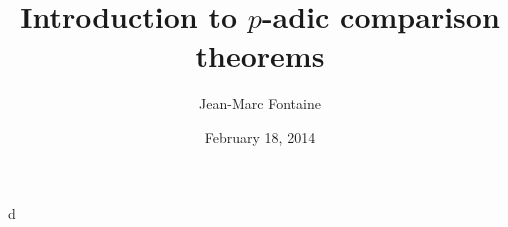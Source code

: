 \documentclass{article}
\title{Introduction to $p$-adic comparison theorems}
\author{Jean-Marc Fontaine}
\date{February 18, 2014}
\begin{document}
\maketitle





d
\end{document}
